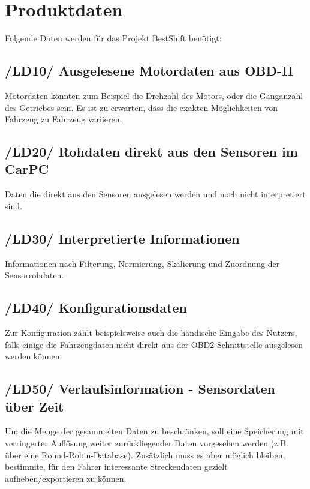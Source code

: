 \newpage
\chapter{Produktdaten}
Folgende Daten werden für das Projekt BestShift benötigt:

\section{/LD10/ Ausgelesene Motordaten aus OBD-II}
Motordaten könnten zum Beispiel die Drehzahl des Motors, oder die Ganganzahl des Getriebes sein. Es ist zu erwarten, dass die exakten Möglichkeiten von Fahrzeug zu Fahrzeug variieren.

\section{/LD20/ Rohdaten direkt aus den Sensoren im CarPC}
Daten die direkt aus den Sensoren ausgelesen werden und noch nicht interpretiert sind. 

\section{/LD30/ Interpretierte Informationen}
Informationen nach Filterung, Normierung, Skalierung und Zuordnung der Sensorrohdaten.

\section{/LD40/ Konfigurationsdaten}
Zur Konfiguration zählt beispielsweise auch die händische Eingabe des Nutzers, falls einige die Fahrzeugdaten nicht direkt aus der OBD2 Schnittstelle ausgelesen werden können. 

\section{/LD50/ Verlaufsinformation - Sensordaten über Zeit}
Um die Menge der gesammelten Daten zu beschränken, soll eine Speicherung mit verringerter Auflösung weiter zurückliegender Daten vorgesehen werden (z.B. über eine Round-Robin-Database). Zusätzlich muss es aber möglich bleiben, bestimmte, für den Fahrer interessante Streckendaten gezielt aufheben/exportieren zu können.